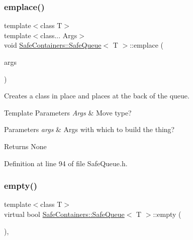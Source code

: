 \mbox{\label{classSafeContainers_1_1SafeQueue_ace84e1b0979f17b49988d6175b89f0d0}} 
\subsubsection{\texorpdfstring{emplace()}{emplace()}}
{\footnotesize\ttfamily template$<$class T$>$ \\
template$<$class... Args$>$ \\
void \mbox{\hyperlink{classSafeContainers_1_1SafeQueue}{Safe\+Containers\+::\+Safe\+Queue}}$<$ T $>$\+::emplace (\begin{DoxyParamCaption}\item[{Args \&\&...}]{args }\end{DoxyParamCaption})\hspace{0.3cm}{\ttfamily [inline]}}



Creates a class in place and places at the back of the queue. 


\begin{DoxyTemplParams}{Template Parameters}
{\em Args} & Move type? \\
\hline
\end{DoxyTemplParams}

\begin{DoxyParams}{Parameters}
{\em args} & Args with which to build the thing? \\
\hline
\end{DoxyParams}
\begin{DoxyReturn}{Returns}
None 
\end{DoxyReturn}


Definition at line 94 of file Safe\+Queue.\+h.

\mbox{\label{classSafeContainers_1_1SafeQueue_a9618125c76454aca006273dd22af2e77}} 
\subsubsection{\texorpdfstring{empty()}{empty()}}
{\footnotesize\ttfamily template$<$class T$>$ \\
virtual bool \mbox{\hyperlink{classSafeContainers_1_1SafeQueue}{Safe\+Containers\+::\+Safe\+Queue}}$<$ T $>$\+::empty (\begin{DoxyParamCaption}{ }\end{DoxyParamCaption})\hspace{0.3cm}{\ttfamily [inline]}, {\ttfamily [virtual]}}



